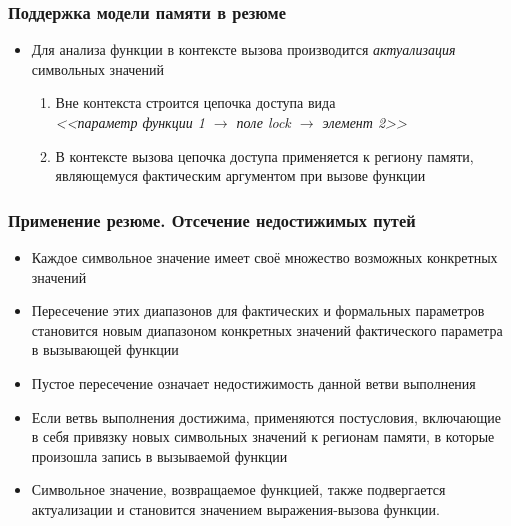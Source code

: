 \documentclass[hyperref={pdfpagelabels=false}]{beamer}
\begin{document}
\begin{frame}
\frametitle{Поддержка модели памяти в резюме}
\begin{itemize}
  \item Для анализа функции в контексте вызова производится \textit{актуализация} символьных значений
  \begin{enumerate}
    \item Вне контекста строится цепочка доступа вида \\ \textit{<<параметр функции 1 $\rightarrow$ поле lock $\rightarrow$ элемент 2>>}
    \item В контексте вызова цепочка доступа применяется к региону памяти, являющемуся фактическим аргументом при вызове функции
  \end{enumerate}
\end{itemize}
\end{frame}

\begin{frame}[allowframebreaks]
\frametitle{Применение резюме. Отсечение недостижимых путей}
\begin{itemize}
  \item Каждое символьное значение имеет своё множество возможных конкретных значений
  \item Пересечение этих диапазонов для фактических и формальных параметров становится новым диапазоном конкретных значений фактического параметра в вызывающей функции
  \item Пустое пересечение означает недостижимость данной ветви выполнения
  \item Если ветвь выполнения достижима, применяются постусловия, включающие в себя привязку новых символьных значений к регионам памяти, в которые произошла запись в вызываемой функции
  \item Символьное значение, возвращаемое функцией, также подвергается актуализации и становится значением выражения-вызова функции.
\end{itemize}
\end{frame}
\end{document}
